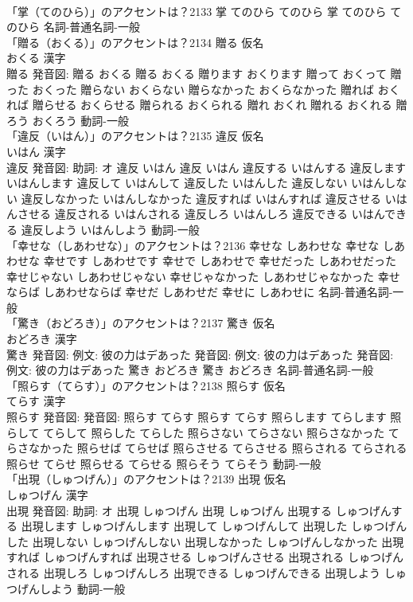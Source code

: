 \documentclass[8pt]{extreport}
\begin{document}
\begin{CJK}{UTF8}{min}
\\	「掌（てのひら）」のアクセントは？2133		掌 てのひら てのひら		掌 てのひら てのひら				名詞-普通名詞-一般 
\\	「贈る（おくる）」のアクセントは？2134	贈る 仮名　
\\	おくる 漢字　
\\	贈る 発音図:	贈る おくる		贈る おくる 贈ります おくります 贈って おくって 贈った おくった 贈らない おくらない 贈らなかった おくらなかった 贈れば おくれば 贈らせる おくらせる 贈られる おくられる 贈れ おくれ 贈れる おくれる 贈ろう おくろう				動詞-一般 
\\	「違反（いはん）」のアクセントは？2135	違反 仮名　
\\	いはん 漢字　
\\	違反 発音図: 助詞: オ	違反 いはん		違反 いはん 違反する いはんする 違反します いはんします 違反して いはんして 違反した いはんした 違反しない いはんしない 違反しなかった いはんしなかった 違反すれば いはんすれば 違反させる いはんさせる 違反される いはんされる 違反しろ いはんしろ 違反できる いはんできる 違反しよう いはんしよう				動詞-一般 
\\	「幸せな（しあわせな）」のアクセントは？2136		幸せな しあわせな		幸せな しあわせな 幸せです しあわせです 幸せで しあわせで 幸せだった しあわせだった 幸せじゃない しあわせじゃない 幸せじゃなかった しあわせじゃなかった 幸せならば しあわせならば 幸せだ しあわせだ 幸せに しあわせに				名詞-普通名詞-一般 
\\	「驚き（おどろき）」のアクセントは？2137	驚き 仮名　
\\	おどろき 漢字　
\\	驚き 発音図: 例文: 彼の力はデあった 発音図: 例文: 彼の力はデあった 発音図: 例文: 彼の力はデあった	驚き おどろき		驚き おどろき				名詞-普通名詞-一般 
\\	「照らす（てらす）」のアクセントは？2138	照らす 仮名　
\\	てらす 漢字　
\\	照らす 発音図: 発音図:	照らす てらす		照らす てらす 照らします てらします 照らして てらして 照らした てらした 照らさない てらさない 照らさなかった てらさなかった 照らせば てらせば 照らさせる てらさせる 照らされる てらされる 照らせ てらせ 照らせる てらせる 照らそう てらそう				動詞-一般 
\\	「出現（しゅつげん）」のアクセントは？2139	出現 仮名　
\\	しゅつげん 漢字　
\\	出現 発音図: 助詞: オ	出現 しゅつげん		出現 しゅつげん 出現する しゅつげんする 出現します しゅつげんします 出現して しゅつげんして 出現した しゅつげんした 出現しない しゅつげんしない 出現しなかった しゅつげんしなかった 出現すれば しゅつげんすれば 出現させる しゅつげんさせる 出現される しゅつげんされる 出現しろ しゅつげんしろ 出現できる しゅつげんできる 出現しよう しゅつげんしよう				動詞-一般 

\end{CJK}
\end{document}
